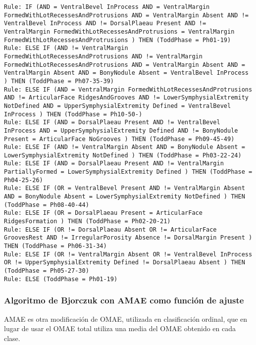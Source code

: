 \begin{lstlisting}
Rule: IF (AND = VentralBevel InProcess AND = VentralMargin FormedWithLotRecessesAndProtrusions AND = VentralMargin Absent AND != VentralBevel InProcess AND != DorsalPlaeau Present AND != VentralMargin FormedWithLotRecessesAndProtrusions = VentralMargin FormedWithLotRecessesAndProtrusions ) THEN (ToddPhase = Ph01-19)
Rule: ELSE IF (AND != VentralMargin FormedWithLotRecessesAndProtrusions AND != VentralMargin FormedWithLotRecessesAndProtrusions AND = VentralMargin Absent AND = VentralMargin Absent AND = BonyNodule Absent = VentralBevel InProcess ) THEN (ToddPhase = Ph07-35-39)
Rule: ELSE IF (AND = VentralMargin FormedWithLotRecessesAndProtrusions AND != ArticularFace RidgesAndGrooves AND != LowerSymphysialExtremity NotDefined AND = UpperSymphysialExtremity Defined = VentralBevel InProcess ) THEN (ToddPhase = Ph10-50-)
Rule: ELSE IF (AND = DorsalPlaeau Present AND != VentralBevel InProcess AND = UpperSymphysialExtremity Defined AND != BonyNodule Present = ArticularFace NoGrooves ) THEN (ToddPhase = Ph09-45-49)
Rule: ELSE IF (AND != VentralMargin Absent AND = BonyNodule Absent = LowerSymphysialExtremity NotDefined ) THEN (ToddPhase = Ph03-22-24)
Rule: ELSE IF (AND = DorsalPlaeau Present AND != VentralMargin PartiallyFormed = LowerSymphysialExtremity Defined ) THEN (ToddPhase = Ph04-25-26)
Rule: ELSE IF (OR = VentralBevel Present AND != VentralMargin Absent AND = BonyNodule Absent = LowerSymphysialExtremity NotDefined ) THEN (ToddPhase = Ph08-40-44)
Rule: ELSE IF (OR = DorsalPlaeau Present = ArticularFace RidgesFormation ) THEN (ToddPhase = Ph02-20-21)
Rule: ELSE IF (OR != DorsalPlaeau Absent OR != ArticularFace GroovesRest AND != IrregularPorosity Absence != DorsalMargin Present ) THEN (ToddPhase = Ph06-31-34)
Rule: ELSE IF (OR != VentralMargin Absent OR != VentralBevel InProcess OR != UpperSymphysialExtremity Defined != DorsalPlaeau Absent ) THEN (ToddPhase = Ph05-27-30)
Rule: ELSE (ToddPhase = Ph01-19)
\end{lstlisting}

\newpage

\subsubsection{Algoritmo de Bjorczuk con AMAE como función de ajuste}


AMAE \cite{funcionesClasificacionOrdinal} es otra modificación de OMAE, utilizada en clasificación ordinal, que en lugar de usar el OMAE total utiliza una media del OMAE obtenido en cada clase.

